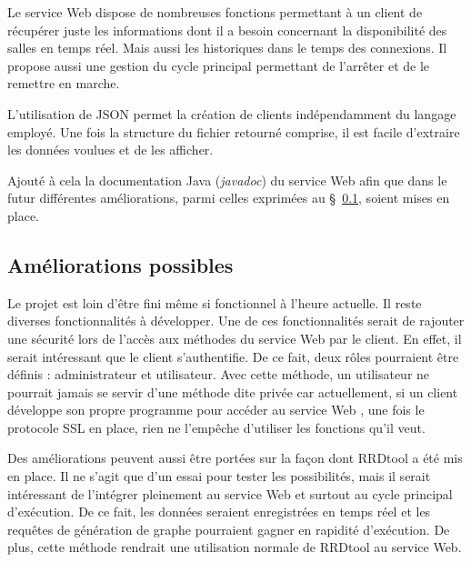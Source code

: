 Le service Web dispose de nombreuses fonctions permettant \`a un client de r\'ecup\'erer juste les informations dont il a besoin concernant la disponibilit\'e des salles en temps r\'eel.
Mais aussi les historiques dans le temps des connexions.
Il propose aussi une gestion du cycle principal permettant de l'arr\^eter et de le remettre en marche.

L'utilisation de JSON permet la cr\'eation de clients ind\'ependamment du langage employ\'e.
Une fois la structure du fichier retourn\'e comprise, il est facile d'extraire les donn\'ees voulues et de les afficher.

Ajout\'e \`a cela la documentation Java (\textit{javadoc}) du service Web afin que dans le futur diff\'erentes am\'eliorations, parmi celles exprim\'ees au \S~\ref{section:amelioration}, soient mises en place.

\subsection{Am\'eliorations possibles}
\label{section:amelioration}

Le projet {\YuukouII} est loin d'\^etre fini m\^eme si fonctionnel \`a l'heure actuelle.
Il reste diverses fonctionnalit\'es \`a d\'evelopper.
Une de ces fonctionnalit\'es serait de rajouter une s\'ecurit\'e lors de l'acc\`es aux m\'ethodes du service Web par le client.
En effet, il serait int\'eressant que le client s'authentifie.
De ce fait, deux r\^oles pourraient \^etre d\'efinis : administrateur et utilisateur.
Avec cette m\'ethode, un utilisateur ne pourrait jamais se servir d'une m\'ethode dite priv\'ee car actuellement, si un client d\'eveloppe son propre programme pour acc\'eder au service Web {\YuukouII}, une fois le protocole SSL en place, rien ne l'emp\^eche d'utiliser les fonctions qu'il veut.

Des am\'eliorations peuvent aussi \^etre port\'ees sur la fa\c{c}on dont RRDtool a \'et\'e mis en place.
Il ne s'agit que d'un essai pour tester les possibilit\'es, mais il serait int\'eressant de l'int\'egrer pleinement au service Web et surtout au cycle principal d'ex\'ecution.
De ce fait, les donn\'ees seraient enregistr\'ees en temps r\'eel et les requ\^etes de g\'en\'eration de graphe pourraient gagner en rapidit\'e d'ex\'ecution.
De plus, cette m\'ethode rendrait une utilisation normale de RRDtool au service Web.

